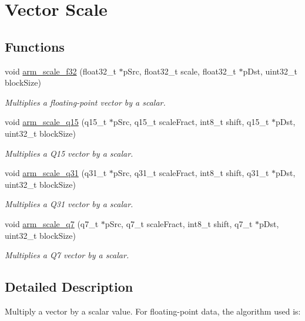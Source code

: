 \hypertarget{group__scale}{}\section{Vector Scale}
\label{group__scale}
\subsection*{Functions}
\begin{DoxyCompactItemize}
\item 
void \hyperlink{group__scale_ga3487af88b112f682ee90589cd419e123}{arm\+\_\+scale\+\_\+f32} (float32\+\_\+t $\ast$p\+Src, float32\+\_\+t scale, float32\+\_\+t $\ast$p\+Dst, uint32\+\_\+t block\+Size)
\begin{DoxyCompactList}\small\item\em Multiplies a floating-\/point vector by a scalar. \end{DoxyCompactList}\item 
void \hyperlink{group__scale_gafaac0e1927daffeb68a42719b53ea780}{arm\+\_\+scale\+\_\+q15} (q15\+\_\+t $\ast$p\+Src, q15\+\_\+t scale\+Fract, int8\+\_\+t shift, q15\+\_\+t $\ast$p\+Dst, uint32\+\_\+t block\+Size)
\begin{DoxyCompactList}\small\item\em Multiplies a Q15 vector by a scalar. \end{DoxyCompactList}\item 
void \hyperlink{group__scale_ga83e36cd82bf51ce35406a199e477d47c}{arm\+\_\+scale\+\_\+q31} (q31\+\_\+t $\ast$p\+Src, q31\+\_\+t scale\+Fract, int8\+\_\+t shift, q31\+\_\+t $\ast$p\+Dst, uint32\+\_\+t block\+Size)
\begin{DoxyCompactList}\small\item\em Multiplies a Q31 vector by a scalar. \end{DoxyCompactList}\item 
void \hyperlink{group__scale_gabc9fd3d37904c58df56492b351d21fb0}{arm\+\_\+scale\+\_\+q7} (q7\+\_\+t $\ast$p\+Src, q7\+\_\+t scale\+Fract, int8\+\_\+t shift, q7\+\_\+t $\ast$p\+Dst, uint32\+\_\+t block\+Size)
\begin{DoxyCompactList}\small\item\em Multiplies a Q7 vector by a scalar. \end{DoxyCompactList}\end{DoxyCompactItemize}


\subsection{Detailed Description}
Multiply a vector by a scalar value. For floating-\/point data, the algorithm used is\+:


